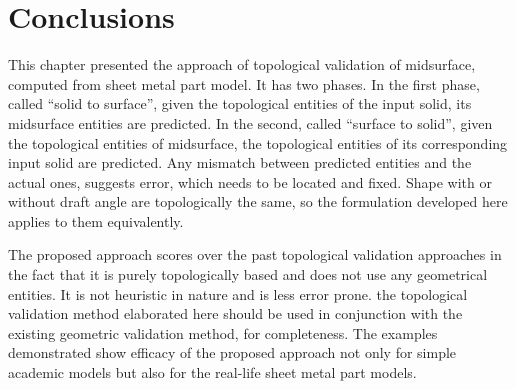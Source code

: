 \section{Conclusions}
This chapter presented the approach of topological validation of midsurface, computed from sheet metal part model. It has two phases. In the first phase, called ``solid to surface'', given the topological entities of the input solid, its midsurface entities are predicted. In the second, called ``surface to solid'', given the topological entities of midsurface, the topological entities of its corresponding input solid are predicted. Any mismatch between predicted entities and the actual ones, suggests error, which needs to be located and fixed. Shape with or without draft angle are topologically the same, so the formulation developed here applies to them equivalently.

The proposed approach scores over the past topological validation approaches in the fact that it is purely topologically based and does not use any geometrical entities. It is not heuristic in nature and is less error prone.  the topological validation method elaborated here should be used in conjunction with the existing geometric validation method, for completeness.  The examples demonstrated show efficacy of the proposed approach not only for simple academic models but also for the real-life sheet metal part models.

